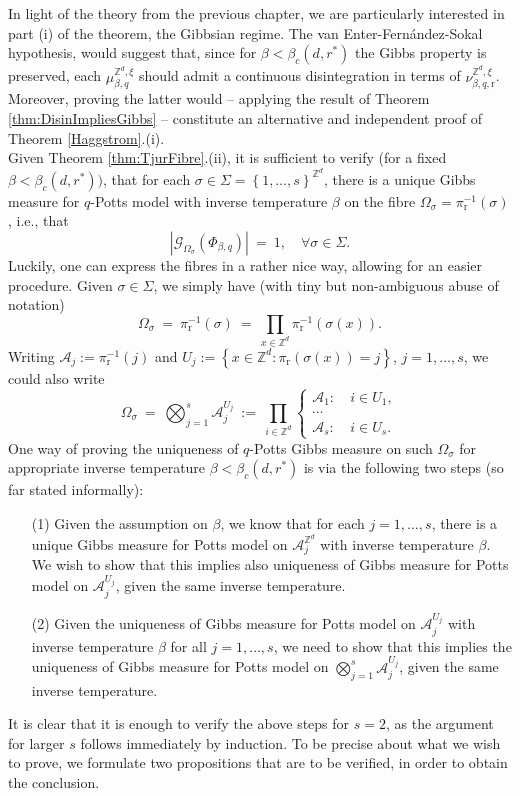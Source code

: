 \documentclass[12pt]{article}
\newcommand{\A}{\mathcal{A}}
\newcommand{\G}{\mathcal{G}}
\renewcommand{\r}{\mathrm{r}}
\newcommand{\Z}{\mathbb{Z}}
\newcommand{\set}[1]{\left\{#1\right\}}
\newcommand{\1}{\mathbbm{1}}
\newcommand{\5}{\vspace{0.5cm}}
\theoremstyle{definition}
\begin{document}
In light of the theory from the previous chapter, we are particularly interested in part (i) of the theorem, the Gibbsian regime. The van Enter-Fern\'andez-Sokal hypothesis, would suggest that, since for $\beta<\beta_c(d,r^*)$ the Gibbs property is preserved, each $\mu_{\beta,q}^{\Z^d,\xi}$ should admit a continuous disintegration in terms of $\nu_{\beta,q,\r}^{\Z^d,\xi}$. Moreover, proving the latter would -- applying the result of Theorem \ref{thm:DisinImpliesGibbs} -- constitute an alternative and independent proof of Theorem \ref{Haggstrom}.(i). \\

Given Theorem \ref{thm:TjurFibre}.(ii), it is sufficient to verify (for a fixed $\beta<\beta_c(d,r^*))$, that for each $\sigma\in\Sigma=\set{1,\ldots,s}^{\Z^d}$, there is a unique Gibbs measure for $q$-Potts model with inverse temperature $\beta$ on the fibre $\Omega_\sigma=\pi_\r^{-1}(\sigma)$, i.e., that
$$|\G_{\Omega_\sigma}(\Phi_{\beta,q})| ~=~ 1, \quad \forall \sigma\in\Sigma.$$
Luckily, one can express the fibres in a rather nice way, allowing for an easier procedure. Given $\sigma\in\Sigma$, we simply have (with tiny but non-ambiguous abuse of notation)
$$\Omega_\sigma ~=~ \pi_{\r}^{-1}(\sigma) ~=~ \prod_{x\in\Z^d}\pi_{\r}^{-1}(\sigma(x)).$$
Writing $\A_j:=\pi_{\r}^{-1}(j)$ and $U_j:=\set{x\in\Z^d:\pi_{\r}(\sigma(x))=j}$, $j=1,\ldots,s$, we could also write
$$\Omega_\sigma ~=~ \bigotimes_{j=1}^s\A_j^{U_j} ~:=~ \prod_{i\in\Z^d}\begin{cases}\A_1:~&i\in U_1,\\
\cdots\\
\A_s:~&i\in U_s.\end{cases}$$
One way of proving the uniqueness of $q$-Potts Gibbs measure on such $\Omega_\sigma$ for appropriate inverse temperature $\beta<\beta_c(d,r^*)$ is via the following two steps (so far stated informally):
\begin{itemize}
	\item[(1)] Given the assumption on $\beta$, we know that for each $j=1,\ldots,s$, there is a unique Gibbs measure for Potts model on $\A_j^{\Z^d}$ with inverse temperature $\beta$. We wish to show that this implies also uniqueness of Gibbs measure for Potts model on $\A_j^{U_j}$, given the same inverse temperature.
	\item[(2)] Given the uniqueness of Gibbs measure for Potts model on $\A_j^{U_j}$ with inverse temperature $\beta$ for all $j=1,\ldots,s$, we need to show that this implies the uniqueness of Gibbs measure for Potts model on $\bigotimes_{j=1}^s \A_j^{U_j}$, given the same inverse temperature.
\end{itemize}
It is clear that it is enough to verify the above steps for $s=2$, as the argument for larger $s$ follows immediately by induction. To be precise about what we wish to prove, we formulate two propositions that are to be verified, in order to obtain the conclusion.
\end{document}

